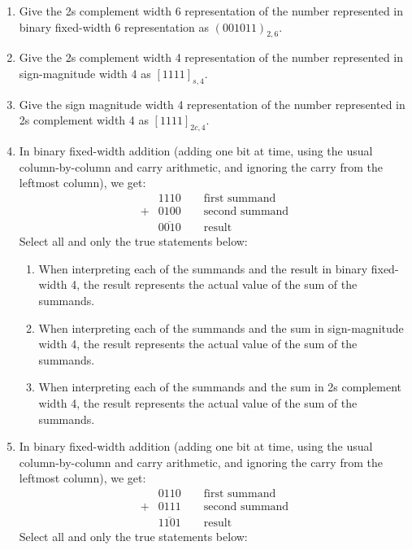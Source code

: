 \documentclass[12pt, oneside]{article}
\begin{document}
\begin{enumerate}
\begin{enumerate}
    \item Give the 2s complement width 6 representation of the number represented in binary fixed-width 6
    representation as $(001011)_{2,6}$. 
    \item Give the 2s complement width 4 representation of the number represented in sign-magnitude
    width 4 as $[1111]_{s,4}$.
    \item Give the sign magnitude width 4 representation of the number represented in 2s complement
    width 4 as $[1111]_{2c,4}$.
    \item In binary fixed-width addition (adding one bit at time, using the usual column-by-column and carry arithmetic, and ignoring the carry from the  leftmost column), we get: 
    \begin{align*}
        &1110  \qquad  \text{first summand}\\
        +&0100 \qquad  \text{second summand}\\
        &\overline{0010} \qquad \text{result}
    \end{align*}
    Select all and only the  true  statements below:
    \begin{enumerate}
        \item When interpreting each of the summands and the result in binary fixed-width 4, 
        the result represents the actual value of the sum of the summands.
        \item When interpreting each of the summands and the sum in sign-magnitude width 4, the result  
        represents the actual value of the sum of the summands.
        \item When interpreting each of the summands and the sum in 2s complement width 4, the result 
        represents the actual value of the sum of the summands.
    \end{enumerate}    
    \item In binary fixed-width addition (adding one bit at time, using the usual column-by-column and carry arithmetic, and ignoring the carry from the  leftmost column), we get: 
    \begin{align*}
        &0110  \qquad  \text{first summand}\\
        +&0111 \qquad  \text{second summand}\\
        &\overline{1101} \qquad \text{result}
    \end{align*}
    Select all and only the  true  statements below:
    \begin{enumerate}

\end{enumerate}
\end{enumerate}
\end{enumerate}
\end{document}
